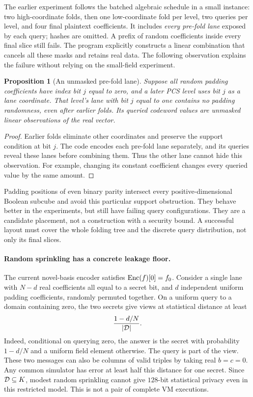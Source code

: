 \documentclass[11pt]{article}
\newtheorem{proposition}{Proposition}
\begin{document}
The earlier experiment follows the batched algebraic schedule in a small instance: two high-coordinate folds, then one low-coordinate fold per level, two queries per level, and four final plaintext coefficients. It includes \emph{every pre-fold lane} exposed by each query; hashes are omitted. A prefix of random coefficients inside every final slice still fails. The program explicitly constructs a linear combination that cancels all these masks and retains real data. The following observation explains the failure without relying on the small-field experiment.

\begin{proposition}[An unmasked pre-fold lane]\label{prop:lane}
Suppose all random padding coefficients have index bit $j$ equal to zero, and a later PCS level uses bit $j$ as a lane coordinate. That level's lane with bit $j$ equal to one contains no padding randomness, even after earlier folds. Its queried codeword values are unmasked linear observations of the real vector.
\end{proposition}
\begin{proof}
Earlier folds eliminate other coordinates and preserve the support condition at bit $j$. The code encodes each pre-fold lane separately, and its queries reveal these lanes before combining them. Thus the other lane cannot hide this observation. For example, changing its constant coefficient changes every queried value by the same amount.
\end{proof}

Padding positions of even binary parity intersect every positive-dimensional Boolean subcube and avoid this particular support obstruction. They behave better in the experiments, but still have failing query configurations. They are a candidate placement, not a construction with a security bound. A successful layout must cover the whole folding tree and the discrete query distribution, not only its final slices.

\paragraph{Random sprinkling has a concrete leakage floor.} The current novel-basis encoder satisfies $\mathrm{Enc}(f)[0]=f_0$. Consider a single lane with $N-d$ real coefficients all equal to a secret bit, and $d$ independent uniform padding coefficients, randomly permuted together. On a uniform query to a domain containing zero, the two secrets give views at statistical distance at least
\[
 \frac{1-d/N}{|\mathcal{D}|}.
\]
Indeed, conditional on querying zero, the answer is the secret with probability $1-d/N$ and a uniform field element otherwise. The query is part of the view. These two messages can also be columns of valid triples by taking real $b=c=0$. Any common simulator has error at least half this distance for one secret. Since $\mathcal{D}\subseteq K$, modest random sprinkling cannot give $128$-bit statistical privacy even in this restricted model. This is not a pair of complete VM executions.
\end{document}
